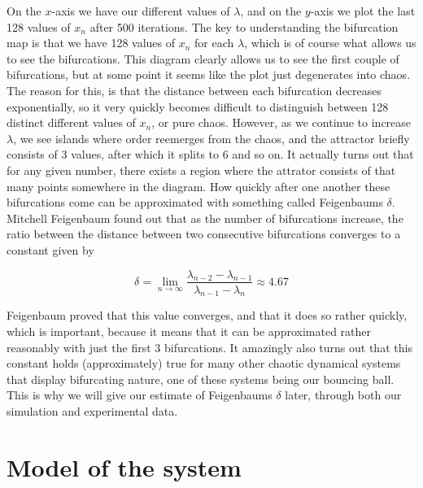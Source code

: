 \documentclass[12pt,oneside,a4paper]{article}
\numberwithin{equation}{section}
\begin{document}
{{{{On the $x$-axis we have our different values of $\lambda$, and on the $y$-axis we plot the last 128 values of $x_n$ after 500 iterations. The key to understanding the bifurcation map is that we have 128 values of $x_n$ for each $\lambda$, which is of course what allows us to see the bifurcations. This diagram clearly allows us to see the first couple of bifurcations, but at some point it seems like the plot just degenerates into chaos. The reason for this, is that the distance between each bifurcation decreases exponentially, so it very quickly becomes difficult to distinguish between 128 distinct different values of $x_n$, or pure chaos. However, as we continue to increase $\lambda$, we see islands where order reemerges from the chaos, and the attractor briefly consists of 3 values, after which it splits to 6 and so on. It actually turns out that for any given number, there exists a region where the attrator consists of that many points somewhere in the diagram. How quickly after one another these bifurcations come can be approximated with something called Feigenbaums $\delta$. Mitchell Feigenbaum found out that as the number of bifurcations increase, the ratio between the distance between two consecutive bifurcations converges to a constant given by

\begin{equation}
\delta=\lim_{n \to \infty} \frac{\lambda_{n-2} - \lambda_{n-1}}{\lambda_{n-1}-\lambda_n} \approx 4.67 \label{Feigenbaumsdelta}
\end{equation}

Feigenbaum proved that this value converges, and that it does so rather quickly, which is important, because it means that it can be approximated rather reasonably with just the first 3 bifurcations. It amazingly also turns out that this constant holds (approximately) true for many other chaotic dynamical systems that display bifurcating nature, one of these systems being our bouncing ball. This is why we will give our estimate of Feigenbaums $\delta$ later, through both our simulation and experimental data.



\section{Model of the system}
\label{modelling}
}}}}
\end{document}
